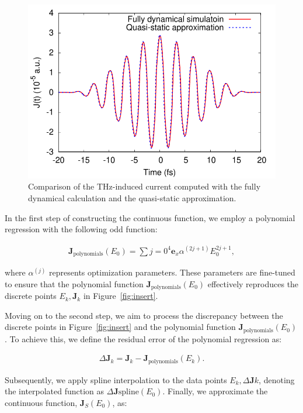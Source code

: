 \begin{figure}[htbp]
	\centering
	\includegraphics[width=0.8\linewidth]{pic/current_comparison_appendix.pdf}
	\caption{\label{fig:current} Comparison of the THz-induced current computed with the fully dynamical calculation and the quasi-static approximation.}
\end{figure}

In the first step of constructing the continuous function, we employ a polynomial regression with the following odd function:

\begin{align}
	\mathbf{J}_{\mathrm{polynomials }}(E_0)= \sum\limits{j=0}^{4} \mathbf e_x \alpha^{(2j+1)} E^{2j+1}_0,
	\label{eq:appendix-polynomial}
\end{align}

where $\alpha^{(j)}$ represents optimization parameters. These parameters are fine-tuned to ensure that the polynomial function $\mathbf{J}_{\mathrm{polynomials }}(E_0)$ effectively reproduces the discrete points ${E_k, \mathbf J_k}$ in Figure~\ref{fig:insert}.

Moving on to the second step, we aim to process the discrepancy between the discrete points in Figure~\ref{fig:insert} and the polynomial function $\mathbf{J}_{\mathrm{polynomials }}(E_0)$. To achieve this, we define the residual error of the polynomial regression as:

\begin{align}
	\Delta \mathbf{J}_k=\mathbf{J}_{k}-\mathbf{J}_{\mathrm{polynomials}}(E_k).
\end{align}

Subsequently, we apply spline interpolation to the data points ${E_k, \Delta \mathbf{J}k}$, denoting the interpolated function as $\Delta \mathbf{J}{\mathrm{spline}}(E_0)$. Finally, we approximate the continuous function, $\mathbf J_S(E_0)$, as:

